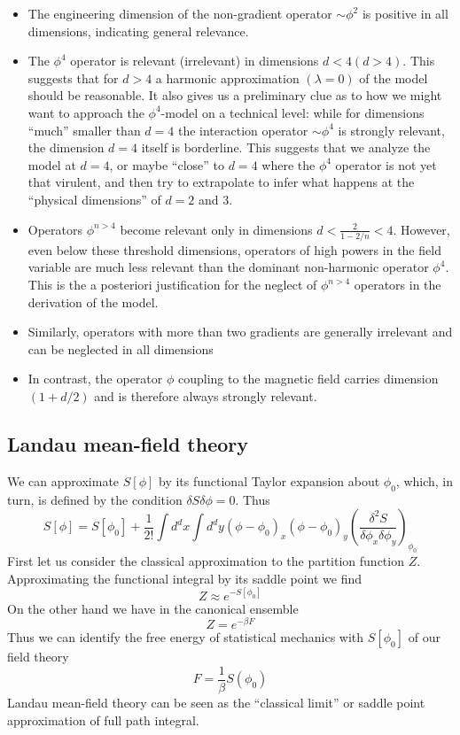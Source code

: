 \begin{itemize}
\item The engineering dimension of the non-gradient operator $\sim \phi^2$ is positive in all dimensions, indicating general relevance.
\item The $\phi^4$ operator is relevant (irrelevant) in dimensions $d < 4 (d > 4)$. This suggests that for $d > 4$ a harmonic approximation $(\lambda = 0)$ of the model should be reasonable. 
It also gives us a preliminary clue as to how we might want to approach the $\phi^4$-model on a technical level: 
while for dimensions ``much'' smaller than $d = 4$ the interaction operator $\sim \phi^4$ is strongly relevant, the dimension $d = 4$ itself is borderline. 
This suggests that we analyze the model at $d = 4$, or maybe ``close''  to $d = 4$ where the $\phi^4$ operator is not yet that virulent, and then try to extrapolate to infer what happens at the ``physical dimensions'' of $d = 2$ and $3$.
\item Operators $\phi^{n > 4}$ become relevant only in dimensions $d < \frac{2}{1-2/n} < 4$. 
However, even below these threshold dimensions, operators of high powers in the field variable are much less relevant than the dominant non-harmonic operator $\phi^4$. This is the a posteriori justification for the neglect of $\phi^{n>4}$ operators in the derivation of the model.
\item Similarly, operators with more than two gradients are generally irrelevant and can be neglected in all dimensions
\item In contrast, the operator $\phi$ coupling to the magnetic field carries dimension $(1+d/2)$ and is therefore always strongly relevant.
\end{itemize}

\subsection{Landau mean-field theory}
We can approximate $S[\phi]$ by its functional Taylor expansion about $\phi_0$, which, in turn, is defined by the condition $\delta S \delta \phi = 0$. Thus
\[S[\phi] = S[\phi_0] + \frac{1}{2!} \int d^dx \int d^dy (\phi-\phi_0)_x (\phi-\phi_0)_y \left( \frac{\delta^2 S}{\delta \phi_x \delta \phi_y} \right)_{\phi_0}\]
First let us consider the classical approximation to the partition function $Z$. Approximating the functional integral by its saddle point we find
\[Z \approx e^{-S[\phi_0]}\]
On the other hand we have in the canonical ensemble
\[Z = e^{-\beta F}\]
Thus we can identify the free energy of statistical mechanics with $S[\phi_0]$ of our field theory
\[F = \frac{1}{\beta} S(\phi_0)\]
Landau mean-field theory can be seen as the ``classical limit'' or saddle point approximation of full path integral.


